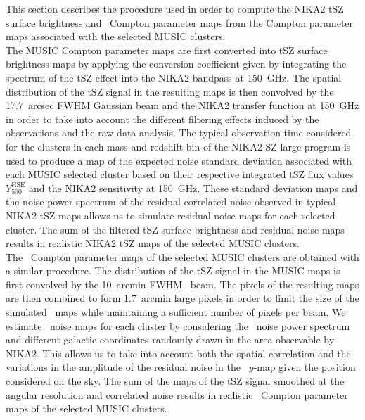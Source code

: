 \documentclass[twocolumn,traditabstract]{aa}
\begin{document}
This section describes the procedure used in order to compute the NIKA2 tSZ surface brightness and \planck\ Compton parameter maps from the Compton parameter maps associated with the selected MUSIC clusters.\\

The MUSIC Compton parameter maps are first converted into tSZ surface brightness maps by applying the conversion coefficient given by integrating the spectrum of the tSZ effect into the NIKA2 bandpass at 150~GHz. The spatial distribution of the tSZ signal in the resulting maps is then convolved by the 17.7~arcsec FWHM Gaussian beam and the NIKA2 transfer function at 150~GHz in order to take into account the different filtering effects induced by the observations and the raw data analysis. The typical observation time considered for the clusters in each mass and redshift bin of the NIKA2 SZ large program is used to produce a map of the expected noise standard deviation associated with each MUSIC selected cluster based on their respective integrated tSZ flux values $Y_{500}^{\mathrm{HSE}}$ and the NIKA2 sensitivity at 150~GHz. These standard deviation maps and the noise power spectrum of the residual correlated noise observed in typical NIKA2 tSZ maps allows us to simulate residual noise maps for each selected cluster. The sum of the filtered tSZ surface brightness and residual noise maps results in realistic NIKA2 tSZ maps of the selected MUSIC clusters.\\

The \planck\ Compton parameter maps of the selected MUSIC clusters are obtained with a similar procedure. The distribution of the tSZ signal in the MUSIC maps is first convolved by the 10~arcmin FWHM \planck\ beam. The pixels of the resulting maps are then combined to form 1.7~arcmin large pixels in order to limit the size of the simulated \planck\ maps while maintaining a sufficient number of pixels per beam. We estimate \planck\ noise maps for each cluster by considering the \planck\ noise power spectrum and different galactic coordinates randomly drawn in the area observable by NIKA2. This allows us to take into account both the spatial correlation and the variations in the amplitude of the residual noise in the \planck\ $y$-map given the  position considered on the sky. The sum of the maps of the tSZ signal smoothed at the angular resolution and correlated noise results in realistic \planck\ Compton parameter maps of the selected MUSIC clusters.\\
\end{document}
